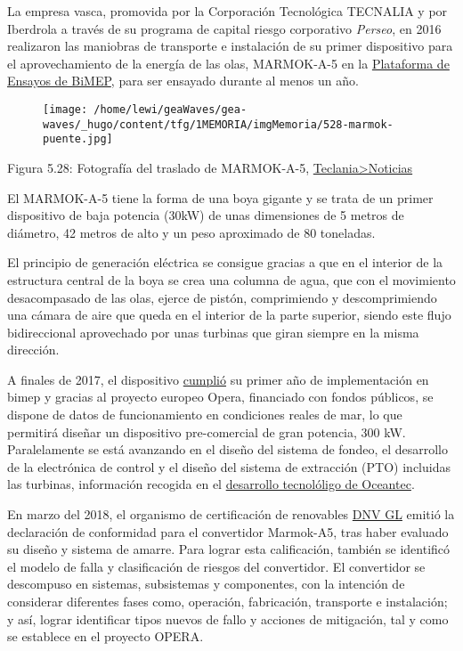 \begin{itemize}
  La empresa vasca, promovida por la Corporación Tecnológica TECNALIA y
  por Iberdrola a través de su programa de capital riesgo corporativo
  \emph{Perseo}, en 2016 realizaron las maniobras de transporte e
  instalación de su primer dispositivo para el aprovechamiento de la
  energía de las olas, MARMOK-A-5 en la
  \href{http://bimep.com/}{Plataforma de Ensayos de BiMEP}, para ser
  ensayado durante al menos un año.

  \begin{figure}
  \centering
  \texttt{[image: /home/lewi/geaWaves/gea-waves/\_hugo/content/tfg/1MEMORIA/imgMemoria/528-marmok-puente.jpg]}
  \caption{}
  \end{figure}

  Figura 5.28: Fotografía del traslado de MARMOK-A-5,
  \href{https://www.tecnalia.com/es/energia-medioambiente/noticias/oceantec-instala-en-bimep-su-primer-dispositivo-para-el-aprovechamiento-de-la-energia-de-las-olas.htm}{Teclania\textgreater{}Noticias}

  El MARMOK-A-5 tiene la forma de una boya gigante y se trata de un
  primer dispositivo de baja potencia (30kW) de unas dimensiones de 5
  metros de diámetro, 42 metros de alto y un peso aproximado de 80
  toneladas.

  El principio de generación eléctrica se consigue gracias a que en el
  interior de la estructura central de la boya se crea una columna de
  agua, que con el movimiento desacompasado de las olas, ejerce de
  pistón, comprimiendo y descomprimiendo una cámara de aire que queda en
  el interior de la parte superior, siendo este flujo bidireccional
  aprovechado por unas turbinas que giran siempre en la misma dirección.

  A finales de 2017, el dispositivo
  \href{https://tidalenergytoday.com/2017/12/15/wave-device-at-bimep-marks-power-export-anniversary/}{cumplió}
  su primer año de implementación en bimep y gracias al proyecto europeo
  Opera, financiado con fondos públicos, se dispone de datos de
  funcionamiento en condiciones reales de mar, lo que permitirá diseñar
  un dispositivo pre-comercial de gran potencia, 300 kW. Paralelamente
  se está avanzando en el diseño del sistema de fondeo, el desarrollo de
  la electrónica de control y el diseño del sistema de extracción (PTO)
  incluidas las turbinas, información recogida en el
  \href{http://www.oceantecenergy.com/}{desarrollo tecnolóligo de
  Oceantec}.

  En marzo del 2018, el organismo de certificación de renovables
  \href{https://www.dnvgl.com/energy/generation/renewables-certification/index.html}{DNV
  GL} emitió la declaración de conformidad para el convertidor
  Marmok-A5, tras haber evaluado su diseño y sistema de amarre. Para
  lograr esta calificación, también se identificó el modelo de falla y
  clasificación de riesgos del convertidor. El convertidor se descompuso
  en sistemas, subsistemas y componentes, con la intención de considerar
  diferentes fases como, operación, fabricación, transporte e
  instalación; y así, lograr identificar tipos nuevos de fallo y
  acciones de mitigación, tal y como se establece en el proyecto OPERA.


\end{itemize}
